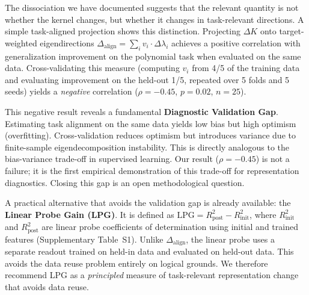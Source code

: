 \documentclass[twoside,11pt]{article}
\begin{document}
The dissociation we have documented suggests that the relevant quantity is not whether the kernel changes, but whether it changes in task-relevant directions.  A simple task-aligned projection shows this distinction. Projecting $\Delta K$ onto target-weighted eigendirections $\Delta_{\text{align}} = \sum_i v_i \cdot \Delta\lambda_i$ achieves a positive correlation with generalization improvement on the polynomial task when evaluated on the same data.  Cross-validating this measure (computing $v_i$ from 4/5 of the training data and evaluating improvement on the held-out 1/5, repeated over 5 folds and 5 seeds) yields a \emph{negative} correlation ($\rho=-0.45$, $p=0.02$, $n=25$).

This negative result reveals a fundamental \textbf{Diagnostic Validation Gap}. Estimating task alignment on the same data yields low bias but high optimism (overfitting). Cross-validation reduces optimism but introduces variance due to finite-sample eigendecomposition instability. This is directly analogous to the bias-variance trade-off in supervised learning. Our result ($\rho=-0.45$) is not a failure; it is the first empirical demonstration of this trade-off for representation diagnostics. Closing this gap is an open methodological question.

A practical alternative that avoids the validation gap is already available: the \textbf{Linear Probe Gain (LPG)}. It is defined as $\text{LPG} = R^2_{\text{post}} - R^2_{\text{init}}$, where $R^2_{\text{init}}$ and $R^2_{\text{post}}$ are linear probe coefficients of determination using initial and trained features (Supplementary Table~S1). Unlike $\Delta_{\text{align}}$, the linear probe uses a separate readout trained on held-in data and evaluated on held-out data. This avoids the data reuse problem entirely on logical grounds. We therefore recommend LPG as a \emph{principled} measure of task-relevant representation change that avoids data reuse.
\end{document}
